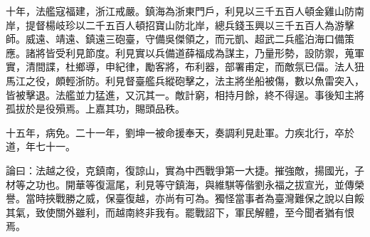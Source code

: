 \begin{pinyinscope}
十年，法艦寇福建，浙江戒嚴。鎮海為浙東門戶，利見以三千五百人頓金雞山防南岸，提督楊岐珍以二千五百人頓招寶山防北岸，總兵錢玉興以三千五百人為游擊師。威遠、靖遠、鎮遠三砲臺，守備吳傑領之，而元凱、超武二兵艦泊海口備策應。諸將皆受利見節度。利見實以兵備道薛福成為謀主，乃量形勢，設防禦，蒐軍實，清間諜，杜鄉導，申紀律，勵客將，布利器，部署甫定，而敵氛已偪。法人狃馬江之役，頗輕浙防。利見督臺艦兵縱砲擊之，法主將坐船被傷，數以魚雷突入，皆被擊退。法艦並力猛進，又沉其一。敵計窮，相持月餘，終不得逞。事後知主將孤拔於是役殞焉。上嘉其功，賜頭品秩。

十五年，病免。二十一年，劉坤一被命援奉天，奏調利見赴軍。力疾北行，卒於道，年七十一。

論曰：法越之役，克鎮南，復諒山，實為中西戰爭第一大捷。摧強敵，揚國光，子材等之功也。開華等復滬尾，利見等守鎮海，與維騏等偕劉永福之拔宣光，並傳榮譽。當時挾戰勝之威，保臺復越，亦尚有可為。獨怪當事者為臺灣難保之說以自餒其氣，致使關外雖利，而越南終非我有。罷戰詔下，軍民解體，至今聞者猶有恨焉。


\end{pinyinscope}